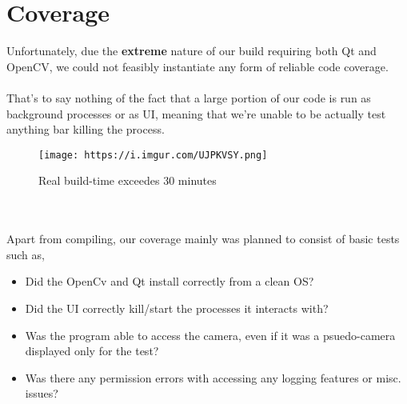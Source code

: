 \documentclass[12pt]{article}
\begin{document}
\section*{Coverage}
Unfortunately, due the \textbf{extreme} nature of our build requiring both Qt and OpenCV, we could not feasibly instantiate any form of reliable code coverage.\\
\\
That's to say nothing of the fact that a large portion of our code is run as background processes or as UI, meaning that we're unable to be actually test anything bar killing the process.
\\\begin{figure}[width=0.25\textwidth]
    \centering
    \texttt{[image: https://i.imgur.com/UJPKVSY.png]}
    \caption{Real build-time exceedes 30 minutes}
\end{figure}
\\
\\Apart from compiling, our coverage mainly was planned to consist of basic tests such as,
\begin{itemize}
  \item Did the OpenCv and Qt install correctly from a clean OS?
  \item Did the UI correctly kill/start the processes it interacts with?
  \item Was the program able to access the camera, even if it was a psuedo-camera displayed only for the test?
  \item Was there any permission errors with accessing any logging features or misc. issues?
\end{itemize}
\pagebreak
\end{document}
